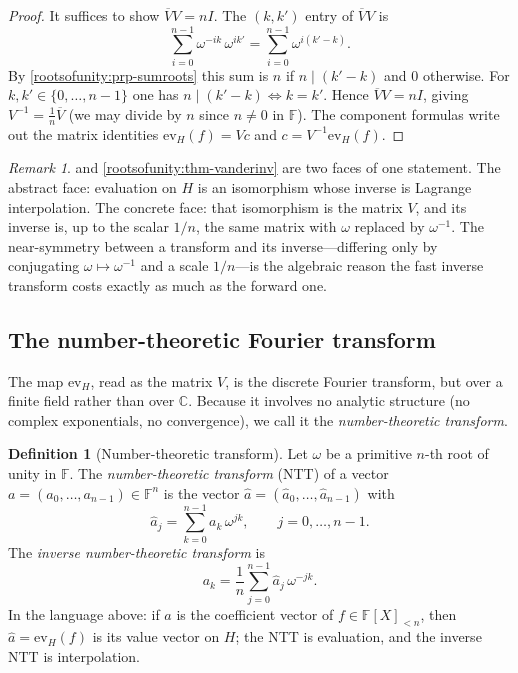 \documentclass[11pt,a4paper]{article}
\theoremstyle{definition}
\newtheorem{definition}[theorem]{Definition}
\theoremstyle{remark}
\newtheorem{remark}[theorem]{Remark}
\providecommand{\C}{}\renewcommand{\C}{\ensuremath{\mathbb{C}}}
\newcommand{\F}{\ensuremath{\mathbb{F}}}
\begin{document}
\begin{proof}
It suffices to show \(\overline V V = n I\). The \((k,k')\) entry of \(\overline V V\) is
\[
  \sum_{i=0}^{n-1} \omega^{-ik}\,\omega^{ik'} = \sum_{i=0}^{n-1} \omega^{i(k'-k)}.
\]
By \cref{rootsofunity:prp-sumroots} this sum is \(n\) if \(n \mid (k'-k)\) and \(0\) otherwise. For \(k,k' \in \{0,\dots,n-1\}\) one has \(n \mid (k'-k) \iff k = k'\). Hence \(\overline V V = nI\), giving \(V^{-1} = \tfrac1n \overline V\) (we may divide by \(n\) since \(n \ne 0\) in \(\F\)). The component formulas write out the matrix identities \(\mathrm{ev}_H(f) = Vc\) and \(c = V^{-1}\mathrm{ev}_H(f)\).
\end{proof}

\begin{remark}\label{rootsofunity:rem-isodict}
 and \cref{rootsofunity:thm-vanderinv} are two faces of one statement. The abstract face: evaluation on \(H\) is an isomorphism whose inverse is Lagrange interpolation. The concrete face: that isomorphism is the matrix \(V\), and its inverse is, up to the scalar \(1/n\), the same matrix with \(\omega\) replaced by \(\omega^{-1}\). The near-symmetry between a transform and its inverse---differing only by conjugating \(\omega \mapsto \omega^{-1}\) and a scale \(1/n\)---is the algebraic reason the fast inverse transform costs exactly as much as the forward one.
\end{remark}

\subsection{The number-theoretic Fourier transform}

The map \(\mathrm{ev}_H\), read as the matrix \(V\), is the discrete Fourier transform, but over a finite field rather than over \(\C\). Because it involves no analytic structure (no complex exponentials, no convergence), we call it the \emph{number-theoretic transform}.

\begin{definition}[Number-theoretic transform]\label{rootsofunity:def-ntt}
Let \(\omega\) be a primitive \(n\)-th root of unity in \(\F\). The \emph{number-theoretic transform} (NTT) of a vector \(a = (a_0,\dots,a_{n-1}) \in \F^n\) is the vector \(\hat a = (\hat a_0,\dots,\hat a_{n-1})\) with
\[
  \hat a_j = \sum_{k=0}^{n-1} a_k\,\omega^{jk}, \qquad j = 0,\dots,n-1.
\]
The \emph{inverse number-theoretic transform} is
\[
  a_k = \frac1n \sum_{j=0}^{n-1} \hat a_j\,\omega^{-jk}.
\]
In the language above: if \(a\) is the coefficient vector of \(f \in \F[X]_{<n}\), then \(\hat a = \mathrm{ev}_H(f)\) is its value vector on \(H\); the NTT is evaluation, and the inverse NTT is interpolation.
\end{definition}
\end{document}
